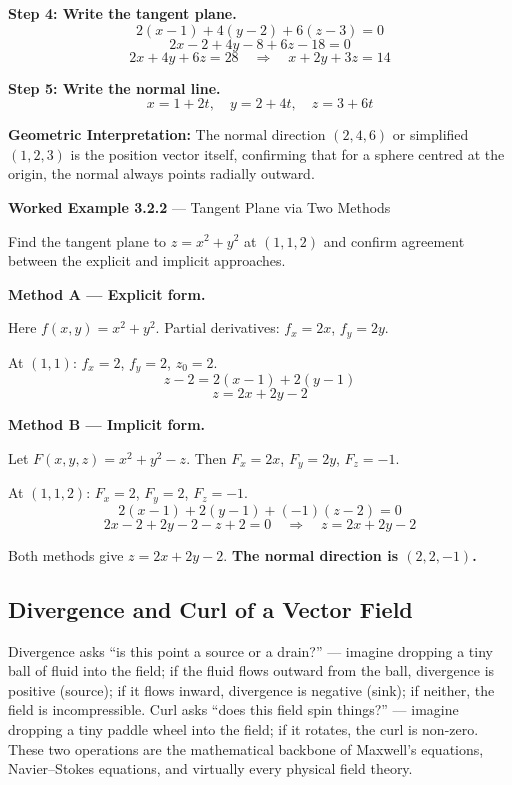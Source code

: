 \documentclass[12pt,a4paper]{article}
\begin{document}
\textbf{Step 4: Write the tangent plane.}
\[
  2(x-1) + 4(y-2) + 6(z-3) = 0
\]
\[
  2x - 2 + 4y - 8 + 6z - 18 = 0
\]
\[
  \boxed{2x + 4y + 6z = 28 \quad \Longrightarrow \quad x + 2y + 3z = 14}
\]

\textbf{Step 5: Write the normal line.}
\[
  x = 1 + 2t, \quad y = 2 + 4t, \quad z = 3 + 6t
\]

\textbf{Geometric Interpretation:} The normal direction $(2,4,6)$ or simplified $(1,2,3)$ is the position vector itself, confirming that for a sphere centred at the origin, the normal always points radially outward.

\vspace{8pt}
\textbf{Worked Example 3.2.2} --- Tangent Plane via Two Methods

Find the tangent plane to $z = x^2 + y^2$ at $(1, 1, 2)$ and confirm agreement between the explicit and implicit approaches.

\textbf{Method A --- Explicit form.}

Here $f(x,y) = x^2 + y^2$. Partial derivatives: $f_x = 2x$, $f_y = 2y$.

At $(1,1)$: $f_x = 2$, $f_y = 2$, $z_0 = 2$.
\[
  z - 2 = 2(x - 1) + 2(y - 1)
\]
\[
  z = 2x + 2y - 2
\]

\textbf{Method B --- Implicit form.}

Let $F(x,y,z) = x^2 + y^2 - z$. Then $F_x = 2x$, $F_y = 2y$, $F_z = -1$.

At $(1,1,2)$: $F_x = 2$, $F_y = 2$, $F_z = -1$.
\[
  2(x-1) + 2(y-1) + (-1)(z-2) = 0
\]
\[
  2x - 2 + 2y - 2 - z + 2 = 0 \quad \Longrightarrow \quad z = 2x + 2y - 2
\]

Both methods give $z = 2x + 2y - 2$. \textbf{The normal direction is $(2, 2, -1)$.}

\subsection{Divergence and Curl of a Vector Field}

Divergence asks ``is this point a source or a drain?'' --- imagine dropping a tiny ball of fluid into the field; if the fluid flows outward from the ball, divergence is positive (source); if it flows inward, divergence is negative (sink); if neither, the field is incompressible. Curl asks ``does this field spin things?'' --- imagine dropping a tiny paddle wheel into the field; if it rotates, the curl is non-zero. These two operations are the mathematical backbone of Maxwell's equations, Navier--Stokes equations, and virtually every physical field theory.
\end{document}
